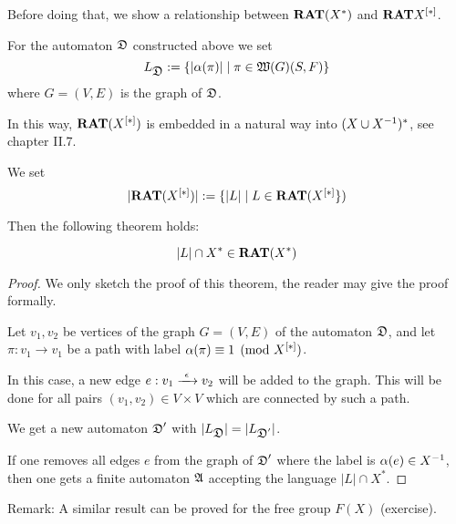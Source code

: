 Before doing that, we show a relationship between $\mbox{{\bf RAT}}(X^*)$ and
$\mbox{{\bf RAT}}{\mbox{${X}^{[*]}$}}$.

For the automaton $\mbox{$\mathfrak{D}$}$ constructed above we set
\[ L_{\mbox{$\mathfrak{D}$}} := \mbox{$\{|\alpha(\pi)| \mid \pi \in \mbox{$\mathfrak{W}({G})$}(S, F)\}$} \]
where $G = (V, E)$ is the graph of $\mbox{$\mathfrak{D}$}$.

In this way, $\mbox{{\bf RAT}}(\mbox{${X}^{[*]}$})$ is embedded in a natural way into
$(X \cup {X}^{-1})^*$, see chapter II.7.

We set
\[ |\mbox{{\bf RAT}}(\mbox{${X}^{[*]}$})| := \mbox{$\{|L| \mid L \in \mbox{{\bf RAT}}(\mbox{${X}^{[*]}$}\}$}) \]

Then the following theorem holds:

\begin{theorem}
\[ |L| \cap X^* \in \mbox{{\bf RAT}}(X^*) \]
\end{theorem}

\begin{proof}
We only sketch the proof of this theorem, the reader may give the proof
formally.

Let $v_1, v_2$ be vertices of the graph $G = (V, E)$ of the automaton $\mbox{$\mathfrak{D}$}$,
and let $\pi: v_1 \to v_1$ be a path with label $\alpha(\pi) \equiv 1
\pmod{\mbox{${X}^{[*]}$}}$.

In this case, a new edge $e: v_1 \xrightarrow{\ {\epsilon}\ } v_2$ will be added to the
graph. This will be done for all pairs $(v_1, v_2) \in V \times V$ which are
connected by such a path.

We get a new automaton $\mbox{$\mathfrak{D}$}'$ with $|L_{\mbox{$\mathfrak{D}$}}| = |L_{\mbox{$\mathfrak{D}$}'}|$.

If one removes all edges $e$ from the graph of $\mbox{$\mathfrak{D}$}'$ where the label is
$\alpha(e) \in {{X}^{-1}}$, then one gets a finite automaton $\mbox{$\mathfrak{A}$}$ accepting the
language $|L| \cap X^*$.
\end{proof}

Remark: A similar result can be proved for the free group $F(X)$
(exercise).


































